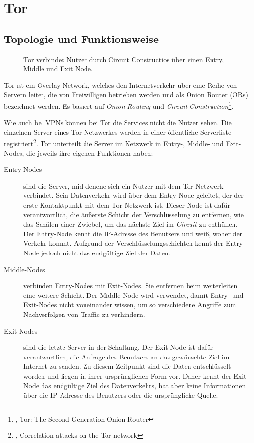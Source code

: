 \section{Tor}
\label{chap:tor}

\subsection{Topologie und Funktionsweise}
\label{chap:tor_topology}
 
\begin{figure}[h!]
    \centering
    
    \caption{Tor verbindet Nutzer durch Circuit Constructios über einen Entry, Middle und Exit Node.}
    \label{imgs:tor}
\end{figure}

Tor ist ein Overlay Network, welches den Internetverkehr über eine Reihe von Servern leitet, die von Freiwilligen betrieben werden und als Onion Router (ORs) bezeichnet werden. Es basiert auf \textit{Onion Routing} und \textit{Circuit Construction}\footnote{\cite{TorWhitePaper}, Tor: The Second-Generation Onion Router}.

Wie auch bei VPNs können bei Tor die Services nicht die Nutzer sehen. Die einzelnen Server eines Tor Netzwerkes werden in einer öffentliche Serverliste registriert\footnote{\cite{CorrelationAttackTor}, Correlation attacks on the Tor network}. Tor unterteilt die Server im Netzwerk in Entry-, Middle- und Exit-Nodes, die jeweils ihre eigenen Funktionen haben:

\begin{description}
    \item[Entry-Nodes] sind die Server, mid denene sich ein Nutzer mit dem Tor-Netzwerk verbindet. Sein Datenverkehr wird über dem Entry-Node geleitet, der der erste Kontaktpunkt mit dem Tor-Netzwerk ist. Dieser Node ist dafür verantwortlich, die äußerste Schicht der Verschlüsselung zu entfernen, wie das Schälen einer Zwiebel, um das nächste Ziel im \textit{Circuit} zu enthüllen. Der Entry-Node kennt die IP-Adresse des Benutzers und weiß, woher der Verkehr kommt. Aufgrund der Verschlüsselungsschichten kennt der Entry-Node jedoch nicht das endgültige Ziel der Daten.
    \item[Middle-Nodes] verbinden Entry-Nodes mit Exit-Nodes. Sie entfernen beim weiterleiten eine weitere Schicht. Der Middle-Node wird verwendet, damit Entry- und Exit-Nodes nicht voneinander wissen, um so verschiedene Angriffe zum Nachverfolgen von Traffic zu verhindern.
    \item[Exit-Nodes] sind  die letzte Server in der Schaltung. Der Exit-Node ist dafür verantwortlich, die Anfrage des Benutzers an das gewünschte Ziel im Internet zu senden. Zu diesem Zeitpunkt sind die Daten entschlüsselt worden und liegen in ihrer ursprünglichen Form vor. Daher kennt der Exit-Node das endgültige Ziel des Datenverkehrs, hat aber keine Informationen über die IP-Adresse des Benutzers oder die ursprüngliche Quelle.
\end{description}

